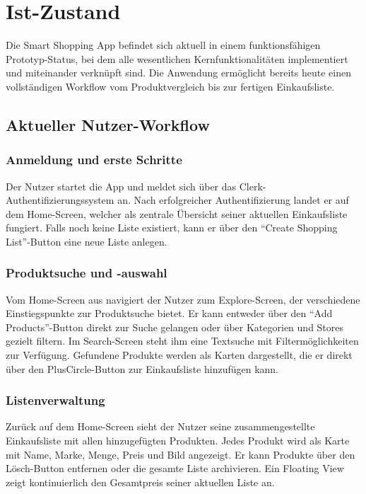 \section{Ist-Zustand}

Die Smart Shopping App befindet sich aktuell in einem funktionsfähigen Prototyp-Status, bei dem alle wesentlichen Kernfunktionalitäten implementiert und miteinander verknüpft sind. Die Anwendung ermöglicht bereits heute einen vollständigen Workflow vom Produktvergleich bis zur fertigen Einkaufsliste.

\subsection{Aktueller Nutzer-Workflow}

\subsubsection{Anmeldung und erste Schritte}
Der Nutzer startet die App und meldet sich über das Clerk-Authentifizierungssystem an. Nach erfolgreicher Authentifizierung landet er auf dem Home-Screen, welcher als zentrale Übersicht seiner aktuellen Einkaufsliste fungiert. Falls noch keine Liste existiert, kann er über den \enquote{Create Shopping List}-Button eine neue Liste anlegen.

\subsubsection{Produktsuche und -auswahl}
Vom Home-Screen aus navigiert der Nutzer zum Explore-Screen, der verschiedene Einstiegspunkte zur Produktsuche bietet. Er kann entweder über den \enquote{Add Products}-Button direkt zur Suche gelangen oder über Kategorien und Stores gezielt filtern. Im Search-Screen steht ihm eine Textsuche mit Filtermöglichkeiten zur Verfügung. Gefundene Produkte werden als Karten dargestellt, die er direkt über den PlusCircle-Button zur Einkaufsliste hinzufügen kann.

\subsubsection{Listenverwaltung}
Zurück auf dem Home-Screen sieht der Nutzer seine zusammengestellte Einkaufsliste mit allen hinzugefügten Produkten. Jedes Produkt wird als Karte mit Name, Marke, Menge, Preis und Bild angezeigt. Er kann Produkte über den Lösch-Button entfernen oder die gesamte Liste archivieren. Ein Floating View zeigt kontinuierlich den Gesamtpreis seiner aktuellen Liste an.

